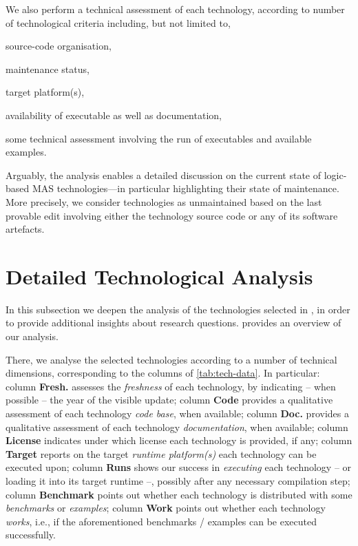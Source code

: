 \documentclass[12pt,a4paper,openright,twoside]{book}
\begin{document}
We also perform a technical assessment of each technology, according to number of technological criteria including, but not limited to,
%
\begin{inlinelist}
    \item source-code organisation,
    \item maintenance status,
    \item target platform(s),
    \item availability of executable as well as documentation,
    \item some technical assessment involving the run of executables and available examples.
\end{inlinelist}
%
Arguably, the analysis enables a detailed discussion on the current state of logic-based MAS technologies---in particular highlighting their state of maintenance.
%
More precisely, we consider technologies as unmaintained based on the last provable edit involving either the technology source code or any of its software artefacts\footnotemark.
%

\section{Detailed Technological Analysis}\label{sec:table-evaluation}



In this subsection we deepen the analysis of the technologies selected in \cite{lptech4mas-jaamas35}, in order to provide additional insights about research questions.
%
 provides an overview of our analysis.

There, we analyse the selected technologies according to a number of technical dimensions, corresponding to the columns of \cref{tab:tech-data}.
%
In particular:
column \textbf{Fresh.} assesses the \emph{freshness} of each technology, by indicating -- when possible -- the year of the visible update;
column \textbf{Code} provides a qualitative assessment of each technology \emph{code base}, when available;
column \textbf{Doc.} provides a qualitative assessment of each technology \emph{documentation}, when available;
column \textbf{License} indicates under which license each technology is provided, if any;
column \textbf{Target} reports on the target \emph{runtime platform(s)} each technology can be executed upon;
column \textbf{Runs} shows our success in \emph{executing} each technology -- or loading it into its target runtime --, possibly after any necessary compilation step;
column \textbf{Benchmark} points out whether each technology is distributed with some \emph{benchmarks} or \emph{examples};
column \textbf{Work} points out whether each technology \emph{works}, i.e., if the aforementioned benchmarks / examples can be executed successfully.
\end{document}
